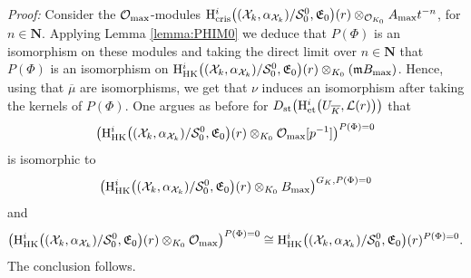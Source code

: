 \documentclass[asterisque,english]{smfart}
\newcommand{\N}{\mathbf{N}}
\begin{document}
{\em Proof:}    Consider the $\mathcal{O}_{\rm max}$-modules  $\mathrm{H}^i_{\mathrm{cris}}\bigl((\mathcal{X}_k,\alpha_{\mathcal{X}_k})/\mathcal{S}_0^0,  \mathfrak{E}_0\bigr) (r) \otimes_{\mathcal{O}_{K_0}} A_{\rm max} t^{-n}$, for $n\in\N$. Applying Lemma \ref{lemma:PHIM0} we deduce that $P(\Phi)$ is an isomorphism on these modules and taking the direct limit over $n\in\N$ that $P(\Phi)$ is an isomorphism on  $\mathrm{H}^i_{\mathrm{HK}}\bigl((\mathcal{X}_k,\alpha_{\mathcal{X}_k})/ \mathcal{S}_0^0, \mathfrak{E}_0\bigr)(r) \otimes_{K_0} (\mathfrak{m} B_{\rm max} )$.
Hence, using that $\overline{\mu}$ are isomorphisms, we get that $\nu$ induces an isomorphism after taking the kernels of $P(\Phi)$.  One argues as before for $D_{\rm st}\bigl(\mathrm{H}^i_{\mathrm{et}}\bigl(U_{\overline{K}}, \mathcal{L}(r)\bigr) \bigr)$  that $$\bigl(\mathrm{H}^i_{\mathrm{HK}}\bigl((\mathcal{X}_k,\alpha_{\mathcal{X}_k})/ \mathcal{S}_0^0, \mathfrak{E}_0\bigr)(r) \otimes_{K_0} \mathcal{O}_{\rm max}[p^{-1}]\bigr)^{P(\Phi)=0}$$ is isomorphic to $$\bigl(\mathrm{H}^i_{\mathrm{HK}}\bigl((\mathcal{X}_k,\alpha_{\mathcal{X}_k})/ \mathcal{S}_0^0, \mathfrak{E}_0\bigr)(r) \otimes_{K_0} B_{\rm max}\bigr)^{G_K,P(\Phi)=0} $$and $$\bigl(\mathrm{H}^i_{\mathrm{HK}}\bigl((\mathcal{X}_k,\alpha_{\mathcal{X}_k})/ \mathcal{S}_0^0, \mathfrak{E}_0\bigr)(r) \otimes_{K_0} \mathcal{O}_{\rm max}\bigr)^{P(\Phi)=0}\cong \mathrm{H}^i_{\mathrm{HK}}\bigl((\mathcal{X}_k,\alpha_{\mathcal{X}_k})/ \mathcal{S}_0^0, \mathfrak{E}_0\bigr)(r) ^{P(\Phi)=0}.$$The conclusion follows. 
\end{document}
